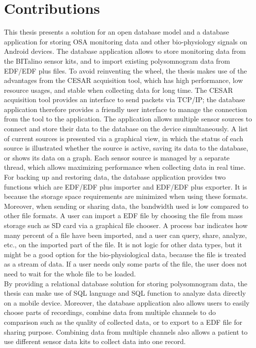 \section{Contributions}
This thesis presents a solution for an open database model and a database application for storing OSA monitoring data and other bio-physiology signals on Android devices. The database application allows to store monitoring data from the BITalino sensor kits, and to import existing polysomnogram data from EDF/EDF plus files. To avoid reinventing the wheel, the thesis makes use of the advantages from the CESAR acquisition tool, which has high performance, low resource usages, and stable when collecting data for long time. The CESAR acquisition tool provides an interface to send packets via TCP/IP; the database application therefore provides a friendly user interface to manage the connection from the tool to the application. The application allows multiple sensor sources to connect and store their data to the database on the device simultaneously. A list of current sources is presented via a graphical view, in which the status of each source is illustrated whether the source is active, saving its data to the database, or shows its data on a graph. Each sensor source is managed by a separate thread, which allows maximizing performance when collecting data in real time.\\
For backing up and restoring data, the database application provides two functions which are EDF/EDF plus importer and EDF/EDF plus exporter. It is because the storage space requirements are minimized when using these formats. Moreover, when sending or sharing data, the bandwidth used is low compared to other file formats. A user can import a EDF file by choosing the file from mass storage such as SD card via a graphical file chooser. A process bar indicates how many percent of a file have been imported, and a user can query, share, analyze, etc., on the imported part of the file. It is not logic for other data types, but it might be a good option for the bio-physiological data, because the file is treated as a stream of data. If a user needs only some parts of the file, the user does not need to wait for the whole file to be loaded.\\
By providing a relational database solution for storing polysomnogram data, the thesis can make use of SQL language and SQL function to analyze data directly on a mobile device. Moreover, the database application also allows users to easily choose parts of recordings, combine data from multiple channels to do comparison such as the quality of collected data, or to export to a EDF file for sharing purpose. Combining data from multiple channels also allows a patient to use different sensor data kits to collect data into one record.\\
